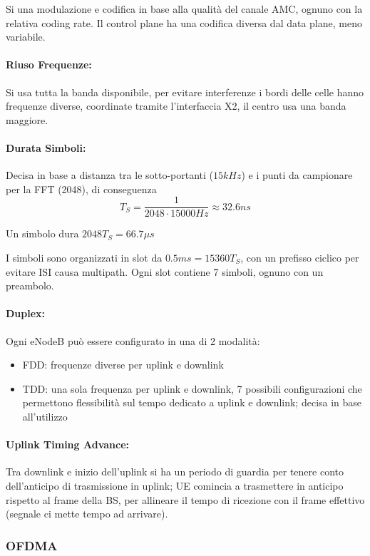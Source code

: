 Si una modulazione e codifica in base alla qualità del canale AMC, ognuno con la relativa coding rate. Il control plane ha una codifica diversa dal data plane, meno variabile.

\paragraph{Riuso Frequenze:} Si usa tutta la banda disponibile, per evitare interferenze i bordi delle celle hanno frequenze diverse, coordinate tramite l'interfaccia X2, il centro usa una banda maggiore. 

\paragraph{Durata Simboli:} Decisa in base a distanza tra le sotto-portanti ($15kHz$) e i punti da campionare per la FFT (2048), di conseguenza
$$ T_S = \frac{1}{2048 \cdot 15000 Hz} \approx 32.6 ns$$

Un simbolo dura $2048 T_S = 66.7 \mu s$

I simboli sono organizzati in slot da $0.5ms = 15360 T_S$, con un prefisso ciclico per evitare ISI causa multipath. Ogni slot contiene 7 simboli, ognuno con un preambolo.

\paragraph{Duplex:} Ogni eNodeB può essere configurato in una di 2 modalità: 
\begin{itemize}
    \item FDD: frequenze diverse per uplink e downlink
    
    \item TDD: una sola frequenza per uplink e downlink, 7 possibili configurazioni che permettono flessibilità sul tempo dedicato a uplink e downlink; decisa in base all'utilizzo
\end{itemize}

\paragraph{Uplink Timing Advance:} Tra downlink e inizio dell'uplink si ha un periodo di guardia per tenere conto dell'anticipo di trasmissione in uplink; UE comincia a trasmettere in anticipo rispetto al frame della BS, per allineare il tempo di ricezione con il frame effettivo (segnale ci mette tempo ad arrivare).

\subsubsection{OFDMA}

